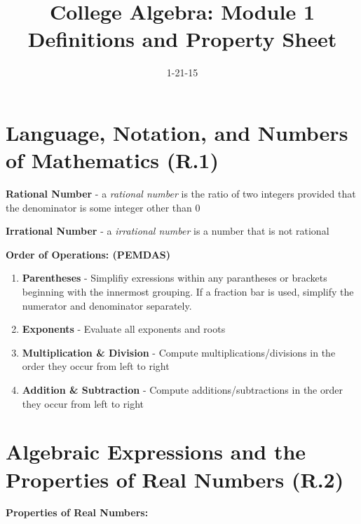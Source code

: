 \documentclass[12pt]{article}
\begin{document}
\title{College Algebra: Module 1 Definitions and Property Sheet}
\date{1-21-15}
\author{}
\maketitle


\section{Language, Notation, and Numbers of Mathematics (R.1)}

\textbf{Rational Number} - a \textit{rational number} is the ratio of two integers provided that the denominator is some integer other than 0

\textbf{Irrational Number} - a \textit{irrational number} is a number that is not rational

\textbf{Order of Operations: (PEMDAS)}
\begin{enumerate}

\item \textbf{Parentheses} - Simplifiy exressions within any parantheses or brackets beginning with the innermost grouping. If a fraction bar is used, simplify the numerator and denominator separately.
\item \textbf{Exponents} - Evaluate all exponents and roots
\item \textbf{Multiplication \& Division} - Compute multiplications/divisions in the order they occur from left to right
\item \textbf{Addition \& Subtraction} - Compute additions/subtractions in the order they occur from left to right

\end{enumerate}

\section{Algebraic Expressions and the Properties of Real Numbers (R.2)}

\textbf{Properties of Real Numbers:}
\end{document}
